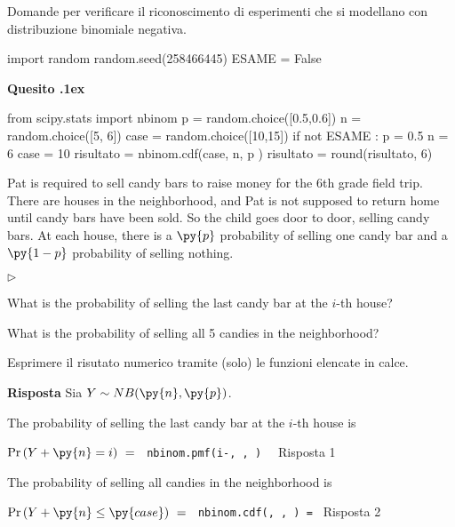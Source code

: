 \documentclass[11pt,twoside,a4paper]{article}
\newcommand{\mylabel}[1]{#1\hfill}
\renewenvironment{itemize}
  {\begin{list}{$\triangleright$}{%
   \setlength{\parskip}{0mm}
   \setlength{\topsep}{.4\baselineskip}
   \setlength{\rightmargin}{0mm}
   \setlength{\listparindent}{0mm}
   \setlength{\itemindent}{0mm}
   \setlength{\labelwidth}{2ex}
   \setlength{\itemsep}{.4\baselineskip}
   \setlength{\parsep}{0mm}
   \setlength{\partopsep}{0mm}
   \setlength{\labelsep}{1ex}
   \setlength{\leftmargin}{\labelwidth+\labelsep}
   \let\makelabel\mylabel}}{%
   \end{list}\vspace*{-1.3mm}}
\def\Ex{{\rm E\,}}
\def\Var{{\rm Var\,}}
\newcounter{quesito}
\newenvironment{question}{\bigskip\addtocounter{quesito}{1}\bigskip\bigskip\par\textbf{Quesito \thequesito.\kern1ex}}{\vspace{\parskip}}
\newenvironment{answer}{\par\textbf{Risposta\quad}}{\vspace{\parskip}}
\begin{document}
\colorbox{blue!10}{\begin{minipage}{\textwidth}
Domande  per verificare il riconoscimento di esperimenti che si modellano con distribuzione binomiale negativa.
\end{minipage}}

\bigskip\bigskip


\begin{pycode}
import random
random.seed(258466445)
ESAME = False
\end{pycode}



\begin{question}
\def\Pr{{\rm Pr\,}}
\def\Ex{{\rm E\,}}
\def\Var{{\rm Var\,}}
\begin{pycode}
from scipy.stats import nbinom
p = random.choice([0.5,0.6])
n = random.choice([5, 6])
case = random.choice([10,15])
if not ESAME :
   p = 0.5
   n = 6
   case = 10
risultato = nbinom.cdf(case, n, p )
risultato = round(risultato, 6)
\end{pycode}
Pat is required to sell candy bars to raise money for the 6th grade field trip. There are  houses in the neighborhood, and Pat is not supposed to return home until  candy bars have been sold. So the child goes door to door, selling candy bars. At each house, there is a $\py{p}$ probability of selling one candy bar and a $\py{1-p}$ probability of selling nothing.
\begin{itemize}
\item[1.] What is the probability of selling the last candy bar at the $i$-th house? 
\item[2.] What is the probability of selling all 5 candies in the neighborhood? 
\end{itemize}

Esprimere il risutato numerico tramite (solo) le funzioni elencate in calce. 
\begin{answer}
Sia $Y\sim NB(\py{n},\py{p})$.

The probability of selling the last candy bar at the $i$-th house is 

$\Pr(Y+\py{n}=i)\ =\ ${\tt{\color{blue}\ nbinom.pmf(i-, ,  ) } } {\color{blue}\hfill Risposta 1}

The probability of selling all  candies in the neighborhood is 

$\Pr(Y+\py{n}\le\py{case})\ =\ ${\tt{\color{blue}\ nbinom.cdf(, ,  ) }=  } {\color{blue}\hfill Risposta 2}\par
\end{answer}
\end{question}
\end{document}
